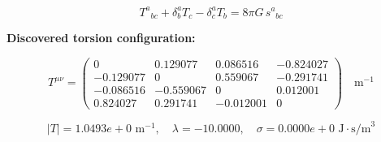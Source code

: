 
\begin{equation}
  T^a{}_{bc} + \delta^a_b T_c - \delta^a_c T_b = 8\pi G \, s^a{}_{bc}
\end{equation}

\textbf{Discovered torsion configuration:}

\begin{equation}
  T^{\mu\nu} = \begin{pmatrix}
    0 & 0.129077 & 0.086516 & -0.824027 \\
    -0.129077 & 0 & 0.559067 & -0.291741 \\
    -0.086516 & -0.559067 & 0 & 0.012001 \\
    0.824027 & 0.291741 & -0.012001 & 0
  \end{pmatrix} \quad \text{m}^{-1}
\end{equation}

\begin{equation}
  |T| = 1.0493e+0 \text{ m}^{-1}, \quad
  \lambda = -10.0000, \quad
  \sigma = 0.0000e+0 \text{ J}\cdot\text{s/m}^3
\end{equation}